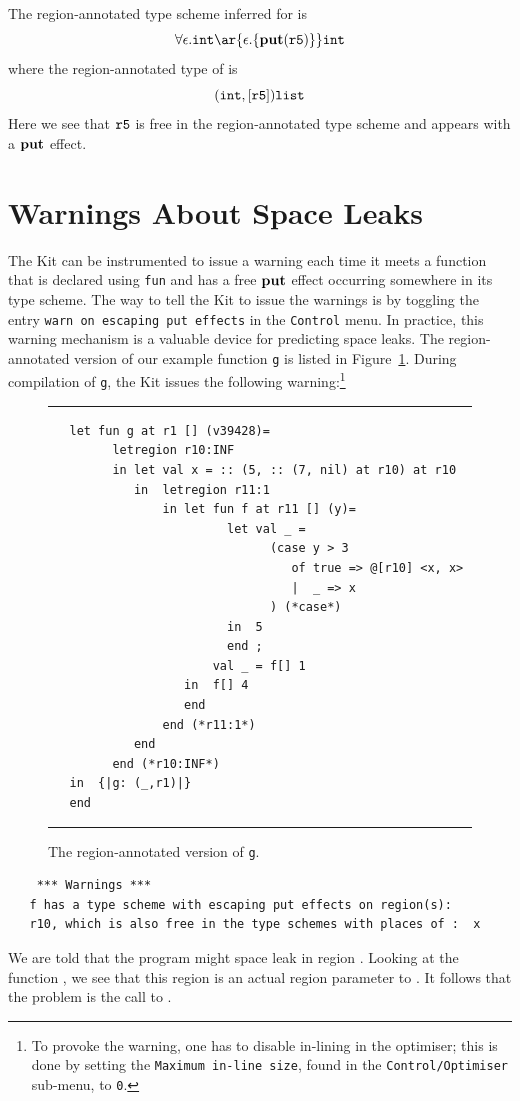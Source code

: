 \documentclass[12pt]{book}
\begin{document}
The region-annotated type scheme inferred for  is
$$\forall\epsilon.\boxml{int} \ar{\epsilon.\{\Put(\mathtt{r5})\}} \boxml{int}$$
where the region-annotated type of  is
$$(\hbox{\tt int},[\hbox{\tt r5}])\hbox{\tt list}$$
Here we see that
$\hbox{\tt r5}$ is free in the region-annotated type scheme and appears
with a $\mathop{\bf put}\nolimits$ effect.

\section{Warnings About Space Leaks}
The Kit can be instrumented to issue a warning each time it meets a
function that is declared using {\tt fun} and has a free $\mathop{\bf put}\nolimits$ effect
occurring somewhere in its type scheme. The way to tell the Kit to
issue the warnings is by toggling the entry 
%
{\tt warn on escaping put
  effects} in the {\tt Control} menu. In practice, this warning
mechanism is a valuable device for predicting space leaks.  The
region-annotated version of our example function {\tt g} is listed in
Figure~\ref{escape_mulexp.fig}. During compilation of {\tt g}, the Kit
issues the following warning:\footnote{To provoke the warning, one has
  to disable in-lining in the
  {\Lam} optimiser; this is done by setting the {\tt Maximum in-line
    size}, found in the {\tt Control/Optimiser} sub-menu, to {\tt 0}.}
\begin{figure}
\hrule
\medskip
\begin{verbatim}
   let fun g at r1 [] (v39428)= 
         letregion r10:INF 
         in let val x = :: (5, :: (7, nil) at r10) at r10
            in  letregion r11:1 
                in let fun f at r11 [] (y)= 
                         let val _ = 
                               (case y > 3 
                                  of true => @[r10] <x, x>
                                  |  _ => x
                               ) (*case*) 
                         in  5
                         end ; 
                       val _ = f[] 1
                   in  f[] 4
                   end  
                end (*r11:1*)
            end  
         end (*r10:INF*)
   in  {|g: (_,r1)|}
   end 
\end{verbatim}
\caption{The region-annotated version of {\tt g}.}
\medskip
\hrule
\label{escape_mulexp.fig}
\end{figure}

\begin{verbatim}
    *** Warnings ***
   f has a type scheme with escaping put effects on region(s): 
   r10, which is also free in the type schemes with places of :  x
\end{verbatim}
We are told that the program might space leak in region .
Looking at the function , we see that this region is an
actual region parameter to . It follows that the problem is
the call to .
\end{document}
